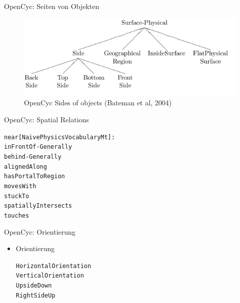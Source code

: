 \documentclass[12pt,a4paper]{beamer}
\begin{document}
\begin{frame}{OpenCyc: Seiten von Objekten }
\begin{figure}
\includegraphics[scale=0.45]{img/d2_opencyc_sides_of_objects.png}
\caption{OpenCyc Sides of objects (Bateman et al, 2004)}
\end{figure}
\end{frame}

\begin{frame}{OpenCyc: Spatial Relations}
\begin{alltt}
near[NaivePhysicsVocabularyMt]:\\
    inFrontOf-Generally\\
    behind-Generally\\
    alignedAlong\\
    hasPortalToRegion\\
    movesWith\\
    stuckTo\\
    spatiallyIntersects\\
    touches\\
\end{alltt}

\end{frame}



\begin{frame}{OpenCyc: Orientierung}
\begin{itemize}
\item Orientierung\\
\begin{alltt}
    HorizontalOrientation\\
    VerticalOrientation\\
    UpsideDown\\
    RightSideUp
\end{alltt}
\end{itemize}
\end{frame}
\end{document}
